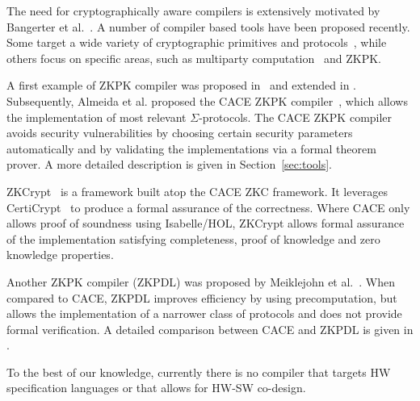
The need for cryptographically aware compilers is extensively motivated by Bangerter et al.~\cite{citeulike:7079130}. A number of compiler based tools have been proposed recently. Some target a wide variety of cryptographic primitives and protocols~\cite{DBLP:conf/weworc/LucksST05,DBLP:conf/issa/BangerterKSU11}, while others focus on specific areas, such as multiparty computation~\cite{DBLP:conf/uss/MalkhiNPS04,DBLP:conf/pkc/DamgardGKN09,DBLP:conf/ccs/HeneckaKSSW10} and ZKPK.

A first example of ZKPK compiler was proposed in~\cite{TUD-CS-2005-0034} and extended in \cite{DBLP:conf/europki/BangerterBHKSS09}. Subsequently, Almeida et al. proposed the CACE ZKPK compiler~\cite{CACE}, which allows the implementation of most relevant $\Sigma$-protocols. The CACE ZKPK compiler avoids security vulnerabilities by choosing certain security parameters automatically and by validating the implementations via a formal theorem prover. A more detailed description is given in Section~\ref{sec:tools}.

ZKCrypt~\cite{zkcrypt} is a framework built atop the CACE ZKC
framework. It leverages CertiCrypt~\cite{certicrypt} to produce a
formal assurance of the correctness. Where CACE only allows proof of
soundness using Isabelle/HOL, ZKCrypt allows formal assurance of the
implementation satisfying completeness, proof of knowledge and zero
knowledge properties.


Another ZKPK compiler (ZKPDL) was proposed by Meiklejohn et al.~\cite{Meiklejohn:2010:ZLS:1929820.1929838}. When compared to CACE, ZKPDL improves efficiency by using precomputation, but allows the implementation of a narrower class of protocols and does not provide formal verification. A detailed comparison between CACE and ZKPDL is given in \cite{Bangerter_yaczk:yet}.

To the best of our knowledge, currently there is no compiler that targets HW specification languages or that allows for HW-SW co-design.

 




